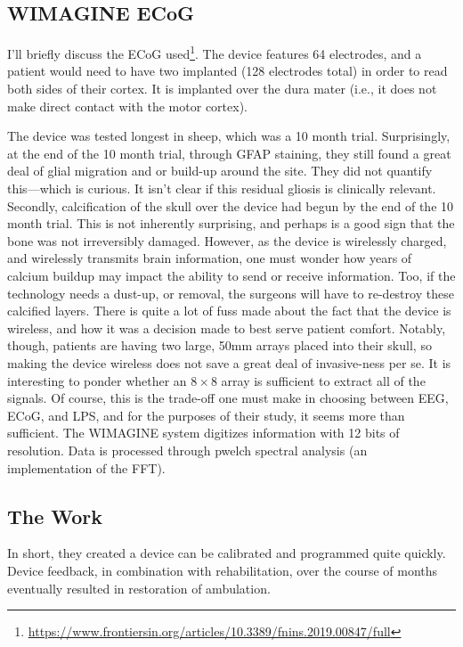 \subsection{WIMAGINE ECoG}
I'll briefly discuss the ECoG used\footnote{\url{https://www.frontiersin.org/articles/10.3389/fnins.2019.00847/full}}. The device features 64 electrodes, and a patient would need to have two implanted (128 electrodes total) in order to read both sides of their cortex. It is implanted over the dura mater (i.e., it does not make direct contact with the motor cortex).\newline

The device was tested longest in sheep, which was a 10 month trial. Surprisingly, at the end of the 10 month trial, through GFAP staining, they still found a great deal of glial migration and or build-up around the site. They did not quantify this---which is curious. It isn't clear if this residual gliosis is clinically relevant. Secondly, calcification of the skull over the device had begun by the end of the 10 month trial. This is not inherently surprising, and perhaps is a good sign that the bone was not irreversibly damaged. However, as the device is wirelessly charged, and wirelessly transmits brain information, one must wonder how years of calcium buildup may impact the ability to send or receive information. Too, if the technology needs a dust-up, or removal, the surgeons will have to re-destroy these calcified layers. There is quite a lot of fuss made about the fact that the device is wireless, and how it was a decision made to best serve patient comfort. Notably, though, patients are having two large, 50mm arrays placed into their skull, so making the device wireless does not save a great deal of invasive-ness per se. It is interesting to ponder whether an $8\times 8$ array is sufficient to extract all of the signals. Of course, this is the trade-off one must make in choosing between EEG, ECoG, and LPS, and for the purposes of their study, it seems more than sufficient. The WIMAGINE system digitizes information with 12 bits of resolution. Data is processed through pwelch spectral analysis (an implementation of the FFT). 

\subsection{The Work} In short, they created a  device can be calibrated and programmed quite quickly. Device feedback, in combination with rehabilitation, over the course of months eventually resulted in restoration of ambulation. 

